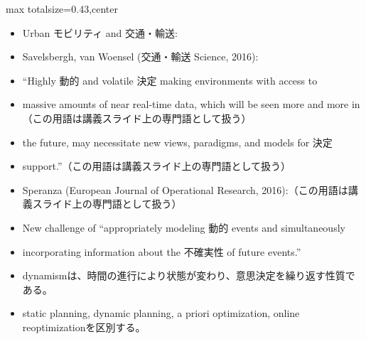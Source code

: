 \clearpage
{}
\begin{minipage}[t]{0.405\textwidth}
\begin{adjustbox}{max totalsize={\textwidth}{0.43\textheight},center}
\begin{minipage}{\textwidth}\scriptsize
{}\begin{itemize}
\item Urban モビリティ and 交通・輸送:
\item Savelsbergh, van Woensel (交通・輸送 Science, 2016):
\item “Highly 動的 and volatile 決定 making environments with access to
\item massive amounts of near real-time data, which will be seen more and more in（この用語は講義スライド上の専門語として扱う）
\item the future, may necessitate new views, paradigms, and models for 決定
\item support.”（この用語は講義スライド上の専門語として扱う）
\item Speranza (European Journal of Operational Research, 2016):（この用語は講義スライド上の専門語として扱う）
\item New challenge of “appropriately modeling 動的 events and simultaneously
\item incorporating information about the 不確実性 of future events.”
\end{itemize}\begin{itemize}
\item dynamismは、時間の進行により状態が変わり、意思決定を繰り返す性質である。
\item static planning, dynamic planning, a priori optimization, online reoptimizationを区別する。
\end{itemize}
\end{minipage}
\end{adjustbox}
\end{minipage}\hfill
